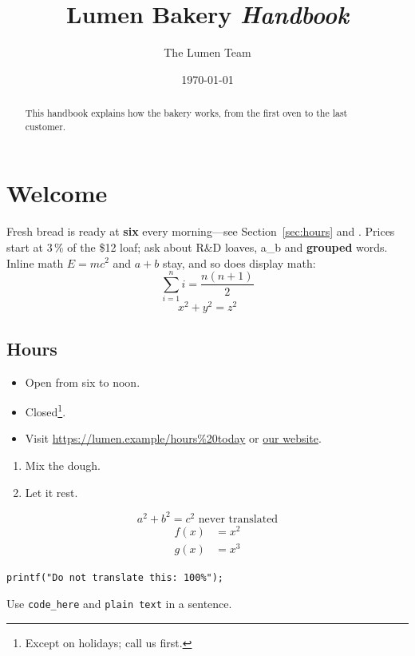 \documentclass[11pt]{article}
\title{Lumen Bakery \emph{Handbook}}
\author{The Lumen Team}
\date{\today}
\begin{document}
\maketitle
\tableofcontents

\begin{abstract}
This handbook explains how the bakery works, from the first oven to the last customer.
\end{abstract}

\section{Welcome}\label{sec:welcome}
Fresh bread is ready at \textbf{six} every morning---see Section~\ref{sec:hours} and \cite[p.~3]{baker99}.
Prices start at 3\,\% of the \$12 loaf; ask about R\&D loaves, a\_b and {\bf grouped} words.
Inline math $E = mc^2$ and \(a+b\) stay, and so does display math:
\[ \sum_{i=1}^n i = \frac{n(n+1)}{2} \]
$$ x^2 + y^2 = z^2 $$

\subsection*{Hours}\label{sec:hours}
\begin{itemize}
  \item Open from six to noon.
  \item[Sundays] Closed\footnote{Except on holidays; call us first.}.
  \item Visit \url{https://lumen.example/hours%20today} or \href{https://lumen.example}{our website}.
\end{itemize}

\begin{enumerate}
  \item Mix the dough. %
  \item Let it rest.
\end{enumerate}

\begin{equation}
  a^2 + b^2 = c^2 \text{ never translated}
\end{equation}
\begin{align*}
  f(x) &= x^2 \\
  g(x) &= x^3
\end{align*}

\begin{verbatim}
printf("Do not translate this: 100%");
\end{verbatim}
Use \verb|code_here| and \texttt{plain text} in a sentence.
\end{document}
